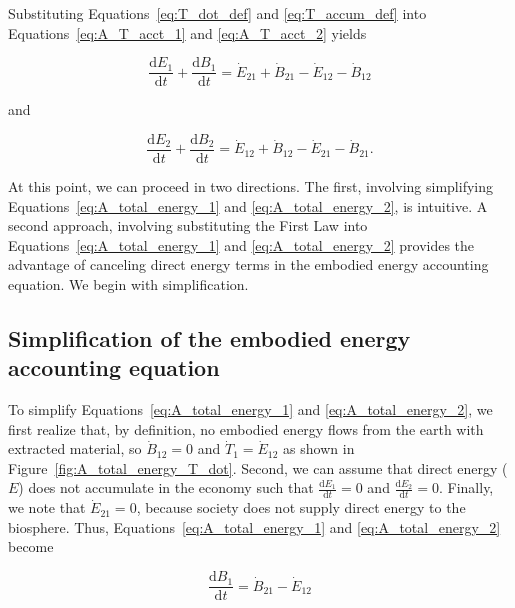 Substituting Equations~\ref{eq:T_dot_def} and
\ref{eq:T_accum_def} into 
Equations~\ref{eq:A_T_acct_1} and \ref{eq:A_T_acct_2}
yields

\begin{equation} \label{eq:A_total_energy_1}
	\frac{\mathrm{d}E_{1}}{\mathrm{d}t} 
	+ \frac{\mathrm{d}B_{1}}{\mathrm{d}t} 
	= \dot{E}_{21} 
	+ \dot{B}_{21} 
	- \dot{E}_{12}
	- \dot{B}_{12}
\end{equation}

\noindent and

\begin{equation} \label{eq:A_total_energy_2}
	\frac{\mathrm{d}E_{2}}{\mathrm{d}t} 
	+ \frac{\mathrm{d}B_{2}}{\mathrm{d}t} 
	= \dot{E}_{12} 
	+ \dot{B}_{12} 
	- \dot{E}_{21}
	- \dot{B}_{21}.	
\end{equation}

At this point, we can proceed in two directions.
The first, involving simplifying Equations~\ref{eq:A_total_energy_1}
and \ref{eq:A_total_energy_2}, is intuitive.
A second approach, involving substituting the First Law
into Equations~\ref{eq:A_total_energy_1} and \ref{eq:A_total_energy_2}
provides the advantage of canceling direct energy terms 
in the embodied energy accounting equation.
We begin with simplification.


\subsection{Simplification of the embodied energy accounting equation} %
\label{sec:A_simplified_embodied}

To simplify Equations~\ref{eq:A_total_energy_1} and \ref{eq:A_total_energy_2},
we first realize that, by definition, no embodied energy flows from 
the earth with extracted material, so $\dot{B}_{12} = 0$
and $\dot{T}_{1} = \dot{E}_{12}$ as shown in Figure~\ref{fig:A_total_energy_T_dot}.
Second, we can assume that direct energy ($E$) does not accumulate
in the economy such that 
$\frac{\mathrm{d}E_1}{\mathrm{d}t} = 0$ and
$\frac{\mathrm{d}E_2}{\mathrm{d}t} = 0$.
Finally, we note that $\dot{E}_{21} = 0$, 
because society does not supply direct energy 
to the biosphere. Thus, Equations~\ref{eq:A_total_energy_1}
and \ref{eq:A_total_energy_2} become

\begin{equation} \label{eq:A_total_energy_1_simp}
	\frac{\mathrm{d}B_{1}}{\mathrm{d}t} 
	= \dot{B}_{21} 
	- \dot{E}_{12}
\end{equation}

